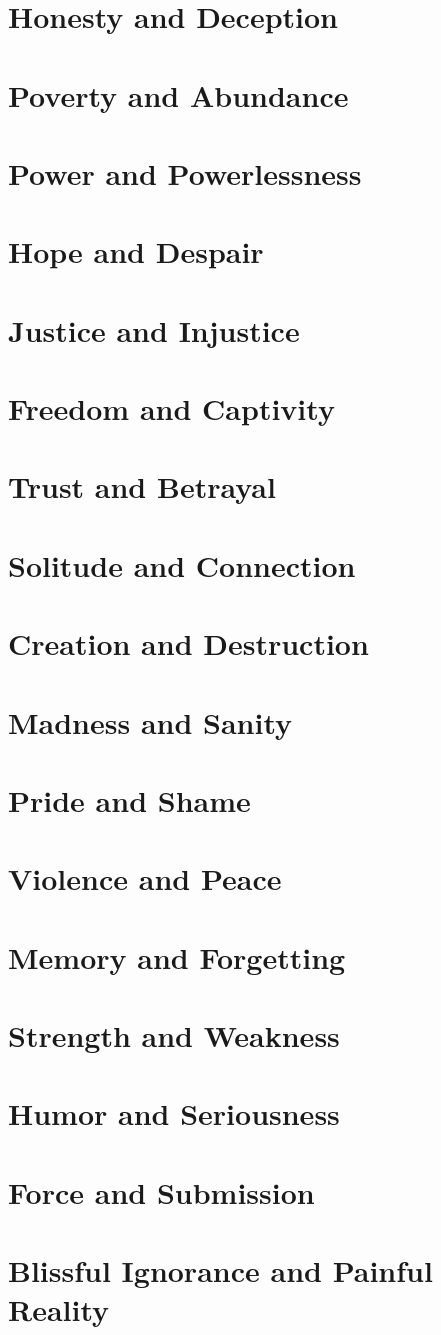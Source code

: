 \documentclass[12pt]{book}
\begin{document}
\chapter{Honesty and Deception}
\chapter{Poverty and Abundance}
\chapter{Power and Powerlessness}
\chapter{Hope and Despair}
\chapter{Justice and Injustice}
\chapter{Freedom and Captivity}
\chapter{Trust and Betrayal}
\chapter{Solitude and Connection}
\chapter{Creation and Destruction}
\chapter{Madness and Sanity}
\chapter{Pride and Shame}
\chapter{Violence and Peace}
\chapter{Memory and Forgetting}
\chapter{Strength and Weakness}
\chapter{Humor and Seriousness}
\chapter{Force and Submission}
\chapter{Blissful Ignorance and Painful Reality}

\end{document}
